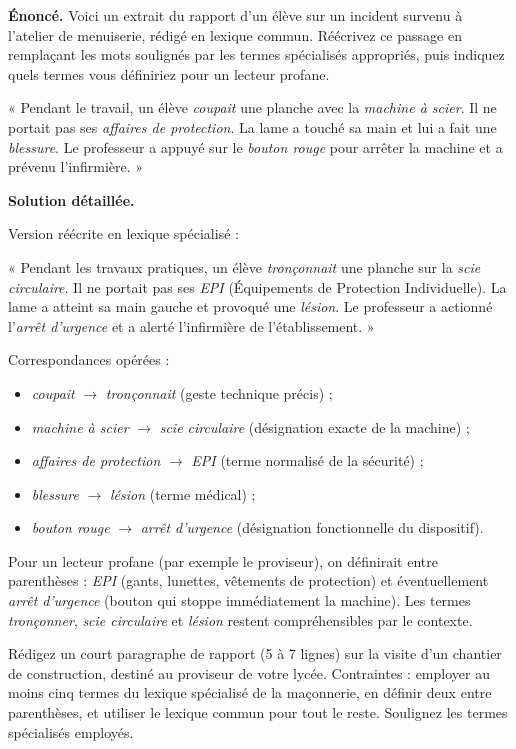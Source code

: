 \documentclass[11pt]{article}
\begin{document}
\begin{exoresolu}
\textbf{Énoncé.} Voici un extrait du rapport d'un élève sur un incident survenu à l'atelier de menuiserie, rédigé en lexique commun. Réécrivez ce passage en remplaçant les mots soulignés par les termes spécialisés appropriés, puis indiquez quels termes vous définiriez pour un lecteur profane.

« Pendant le travail, un élève \emph{coupait} une planche avec la \emph{machine à scier}. Il ne portait pas ses \emph{affaires de protection}. La lame a touché sa main et lui a fait une \emph{blessure}. Le professeur a appuyé sur le \emph{bouton rouge} pour arrêter la machine et a prévenu l'infirmière. »

\tcblower
\textbf{Solution détaillée.}

Version réécrite en lexique spécialisé :

« Pendant les travaux pratiques, un élève \emph{tronçonnait} une planche sur la \emph{scie circulaire}. Il ne portait pas ses \emph{EPI} (Équipements de Protection Individuelle). La lame a atteint sa main gauche et provoqué une \emph{lésion}. Le professeur a actionné l'\emph{arrêt d'urgence} et a alerté l'infirmière de l'établissement. »

Correspondances opérées :
\begin{itemize}
\item \emph{coupait} $\rightarrow$ \emph{tronçonnait} (geste technique précis) ;
\item \emph{machine à scier} $\rightarrow$ \emph{scie circulaire} (désignation exacte de la machine) ;
\item \emph{affaires de protection} $\rightarrow$ \emph{EPI} (terme normalisé de la sécurité) ;
\item \emph{blessure} $\rightarrow$ \emph{lésion} (terme médical) ;
\item \emph{bouton rouge} $\rightarrow$ \emph{arrêt d'urgence} (désignation fonctionnelle du dispositif).
\end{itemize}

Pour un lecteur profane (par exemple le proviseur), on définirait entre parenthèses : \emph{EPI} (gants, lunettes, vêtements de protection) et éventuellement \emph{arrêt d'urgence} (bouton qui stoppe immédiatement la machine). Les termes \emph{tronçonner}, \emph{scie circulaire} et \emph{lésion} restent compréhensibles par le contexte.
\end{exoresolu}

\begin{exercice}
Rédigez un court paragraphe de rapport (5 à 7 lignes) sur la visite d'un chantier de construction, destiné au proviseur de votre lycée. Contraintes : employer au moins cinq termes du lexique spécialisé de la maçonnerie, en définir deux entre parenthèses, et utiliser le lexique commun pour tout le reste. Soulignez les termes spécialisés employés.
\end{exercice}
\end{document}
